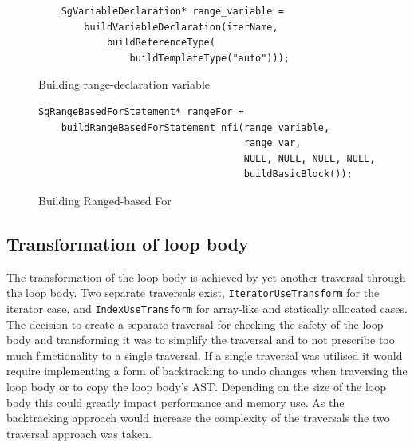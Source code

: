 \documentclass[bsc,frontabs,singlespacing,twoside,parskip,deptreport]{infthesis}
\begin{document}
\begin{figure}[H]
    \centering
    \begin{verbatim}
    SgVariableDeclaration* range_variable =
        buildVariableDeclaration(iterName, 
            buildReferenceType(
                buildTemplateType("auto"))); 
    \end{verbatim}
    \caption{Building range-declaration variable}
    \label{fig:range-dec-var}
\end{figure}

\begin{figure}[H]
    \centering
    \begin{verbatim}
SgRangeBasedForStatement* rangeFor =
    buildRangeBasedForStatement_nfi(range_variable,
                                    range_var,
                                    NULL, NULL, NULL, NULL,
                                    buildBasicBlock());    
    \end{verbatim}
    \caption{Building Ranged-based For}
    \label{fig:range-based-for-stmt}
\end{figure}

\subsection{Transformation of loop body}

The transformation of the loop body is achieved by yet another traversal through the loop body. Two separate traversals exist, \texttt{IteratorUseTransform} for the iterator case, and \texttt{IndexUseTransform} for array-like and statically allocated cases. The decision to create a separate traversal for checking the safety of the loop body and transforming it was to simplify the traversal and to not prescribe too much functionality to a single traversal. If a single traversal was utilised it would require implementing a form of backtracking to undo changes when traversing the loop body or to copy the loop body's AST. Depending on the size of the loop body this could greatly impact performance and memory use. As the backtracking approach would increase the complexity of the traversals the two traversal approach was taken.
\end{document}
